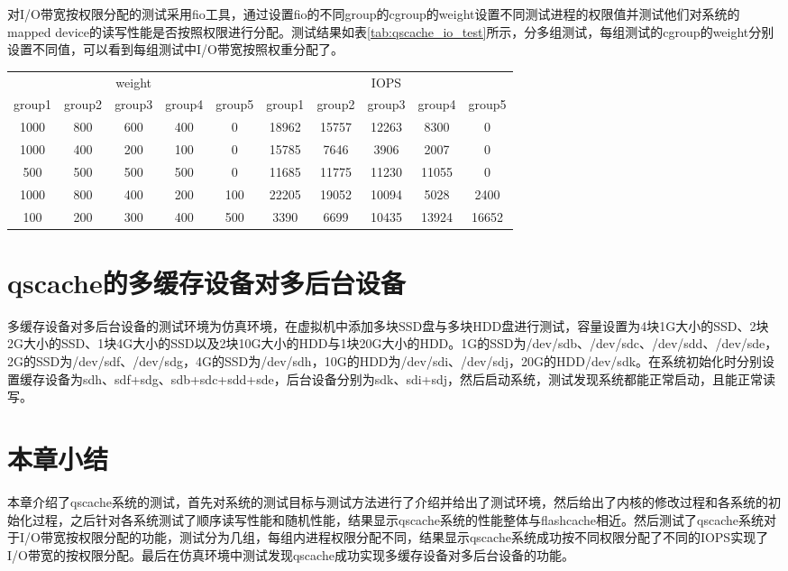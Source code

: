 对I/O带宽按权限分配的测试采用fio工具，通过设置fio的不同group的cgroup的weight设置不同测试进程的权限值并测试他们对系统的mapped device的读写性能是否按照权限进行分配。测试结果如表\ref{tab:qscache_io_test}所示，分多组测试，每组测试的cgroup的weight分别设置不同值，可以看到每组测试中I/O带宽按照权重分配了。

\begin{table}[!hpb]
    \centering
    \begin{tabular}{@{}cccccccccc@{}} 
        \toprule
        \multicolumn{5}{c}{weight} & \multicolumn{5}{c}{IOPS}\\
        group1 & group2 & group3 & group4 & group5 & group1 & group2 & group3 & group4 & group5 \\
        \midrule
        1000 & 800 & 600 & 400 & 0 & 18962 & 15757 & 12263 & 8300 & 0\\
        1000 & 400 & 200 & 100 & 0 & 15785 & 7646 & 3906 & 2007 & 0 \\ 
        500 & 500 & 500 & 500 & 0 & 11685 & 11775 & 11230 & 11055 & 0 \\ 
        1000 & 800 & 400 & 200 & 100 & 22205 & 19052 & 10094 & 5028 & 2400\\ 
        100 & 200 & 300 & 400 & 500 & 3390 & 6699 & 10435 & 13924 & 16652\\
        \bottomrule
    \end{tabular}
\end{table}

\section{qscache的多缓存设备对多后台设备}

多缓存设备对多后台设备的测试环境为仿真环境，在虚拟机中添加多块SSD盘与多块HDD盘进行测试，容量设置为4块1G大小的SSD、2块2G大小的SSD、1块4G大小的SSD以及2块10G大小的HDD与1块20G大小的HDD。1G的SSD为/dev/sdb、/dev/sdc、/dev/sdd、/dev/sde，2G的SSD为/dev/sdf、/dev/sdg，4G的SSD为/dev/sdh，10G的HDD为/dev/sdi、/dev/sdj，20G的HDD/dev/sdk。在系统初始化时分别设置缓存设备为sdh、sdf+sdg、sdb+sdc+sdd+sde，后台设备分别为sdk、sdi+sdj，然后启动系统，测试发现系统都能正常启动，且能正常读写。

\section{本章小结}

本章介绍了qscache系统的测试，首先对系统的测试目标与测试方法进行了介绍并给出了测试环境，然后给出了内核的修改过程和各系统的初始化过程，之后针对各系统测试了顺序读写性能和随机性能，结果显示qscache系统的性能整体与flashcache相近。然后测试了qscache系统对于I/O带宽按权限分配的功能，测试分为几组，每组内进程权限分配不同，结果显示qscache系统成功按不同权限分配了不同的IOPS实现了I/O带宽的按权限分配。最后在仿真环境中测试发现qscache成功实现多缓存设备对多后台设备的功能。